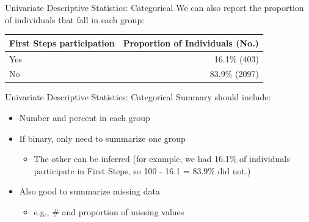\documentclass[10pt,t]{beamer}
\begin{document}
\begin{frame}{Univariate Descriptive Statistics: Categorical}
We can also report the proportion of individuals that fall in each group:

\vspace{0.3cm}

\begin{table}
	\centering
	\begin{tabular}{l|r}
		\textbf{First Steps participation} & \textbf{Proportion of Individuals (No.)} \\
		\hline
		Yes & 16.1\% (403)\\
		\hline
		No & 83.9\% (2097)
	\end{tabular}
\end{table}

\end{frame}

\begin{frame}{Univariate Descriptive Statistics: Categorical}
Summary should include:

\vspace{0.3cm}

\begin{itemize}
	\item Number and percent in each group
	\item If binary, only need to summarize one group
	\begin{itemize}
		\item The other can be inferred (for example, we had 16.1\% of individuals participate in First Steps, so 100 - 16.1 = 83.9\% did not.)
	\end{itemize}
	\item Also good to summarize missing data
	\begin{itemize}
		\item e.g., \# and proportion of missing values
	\end{itemize}
\end{itemize}	
\end{frame}
\end{document}
